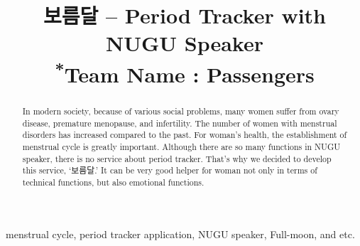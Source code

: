 \documentclass[conference]{IEEEtran}
\begin{document}
\title{보름달 – Period Tracker with NUGU Speaker\\
{\footnotesize \textsuperscript{*}Team Name : Passengers}
}

\author{
\and
{}
\and
{}
\and
{}
}

\maketitle

\begin{abstract}
In modern society, because of various social problems, many women suffer from ovary disease, premature menopause, and infertility. The number of women with menstrual disorders has increased compared to the past. For woman’s health, the establishment of menstrual cycle is greatly important. Although there are so many functions in NUGU speaker, there is no service about period tracker. That’s why we decided to develop this service, ‘보름달.’ It can be very good helper for woman not only in terms of technical functions, but also emotional functions.
\end{abstract}

\begin{IEEEkeywords}
menstrual cycle, period tracker application, NUGU speaker, Full-moon, and etc.
\end{IEEEkeywords}
\end{document}
